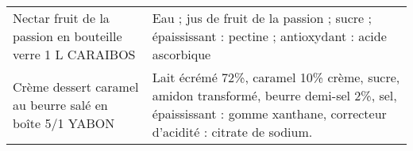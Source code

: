 \begin{longtable}{p{5cm}p{10cm}}
                                               Nectar fruit de la passion en bouteille verre 1 L CARAIBOS &                                                                                                                                                                                                                                                                                                                                                                                                                                                                                                                                                                                                                                                                                                                                                                                                                                                                                                                                       Eau ; jus de fruit de la passion ; sucre ; épaississant : pectine ; antioxydant : acide ascorbique \\
                                                  Crème dessert caramel au beurre salé en boîte 5/1 YABON &                                                                                                                                                                                                                                                                                                                                                                                                                                                                                                                                                                                                                                                                                                                                                                                                                                                                          Lait écrémé 72\%, caramel 10\% crème, sucre, amidon transformé, beurre demi-sel 2\%, sel, épaississant : gomme xanthane, correcteur d'acidité : citrate de sodium. \\

\end{longtable}
